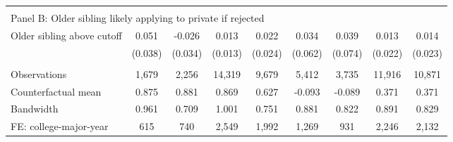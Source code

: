 {{\begin{tabular}{lcccccccc}
&  &  &  & & & & & &    \\
\multicolumn{9}{l}{Panel B: Older sibling likely applying to private if rejected} \\
Older sibling above cutoff&       0.051   &      -0.026   &       0.013   &       0.022   &       0.034   &       0.039   &       0.013   &       0.014   \\
                    &     (0.038)   &     (0.034)   &     (0.013)   &     (0.024)   &     (0.062)   &     (0.074)   &     (0.022)   &     (0.023)   \\
                    &               &               &               &               &               &               &               &               \\
Observations        &       1,679   &       2,256   &      14,319   &       9,679   &       5,412   &       3,735   &      11,916   &      10,871   \\
Counterfactual mean &       0.875   &       0.881   &       0.869   &       0.627   &      -0.093   &      -0.089   &       0.371   &       0.371   \\
Bandwidth           &       0.961   &       0.709   &       1.001   &       0.751   &       0.881   &       0.822   &       0.891   &       0.829   \\
FE: college-major-year&         615   &         740   &       2,549   &       1,992   &       1,269   &         931   &       2,246   &       2,132   \\
 

\bottomrule
\end{tabular}
}
}
